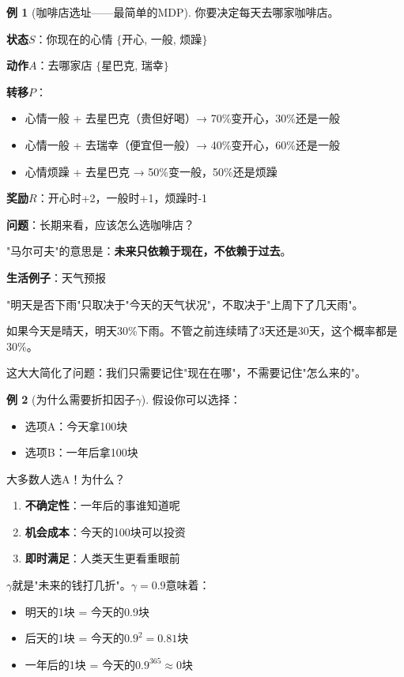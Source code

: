 \documentclass[11pt,a4paper]{article}
\theoremstyle{definition}
\newtheorem{example}{例}[section]
\begin{document}
\begin{example}[咖啡店选址——最简单的MDP]
你要决定每天去哪家咖啡店。

\textbf{状态}$S$：你现在的心情 $\{$开心, 一般, 烦躁$\}$

\textbf{动作}$A$：去哪家店 $\{$星巴克, 瑞幸$\}$

\textbf{转移}$P$：
\begin{itemize}
    \item 心情一般 + 去星巴克（贵但好喝）→ 70\%变开心，30\%还是一般
    \item 心情一般 + 去瑞幸（便宜但一般）→ 40\%变开心，60\%还是一般
    \item 心情烦躁 + 去星巴克 → 50\%变一般，50\%还是烦躁
\end{itemize}

\textbf{奖励}$R$：开心时+2，一般时+1，烦躁时-1

\textbf{问题}：长期来看，应该怎么选咖啡店？
\end{example}

\begin{plainwords}[马尔可夫性质]
"马尔可夫"的意思是：\textbf{未来只依赖于现在，不依赖于过去}。

\textbf{生活例子}：天气预报

"明天是否下雨"只取决于"今天的天气状况"，不取决于"上周下了几天雨"。

如果今天是晴天，明天30\%下雨。不管之前连续晴了3天还是30天，这个概率都是30\%。

这大大简化了问题：我们只需要记住"现在在哪"，不需要记住"怎么来的"。
\end{plainwords}

\begin{example}[为什么需要折扣因子$\gamma$]
假设你可以选择：
\begin{itemize}
    \item 选项A：今天拿100块
    \item 选项B：一年后拿100块
\end{itemize}

大多数人选A！为什么？

\begin{enumerate}
    \item \textbf{不确定性}：一年后的事谁知道呢
    \item \textbf{机会成本}：今天的100块可以投资
    \item \textbf{即时满足}：人类天生更看重眼前
\end{enumerate}

$\gamma$就是"未来的钱打几折"。$\gamma = 0.9$意味着：
\begin{itemize}
    \item 明天的1块 = 今天的0.9块
    \item 后天的1块 = 今天的$0.9^2 = 0.81$块
    \item 一年后的1块 = 今天的$0.9^{365} \approx 0$块
\end{itemize}
\end{example}
\end{document}

